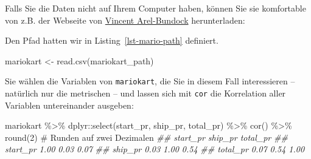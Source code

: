 \documentclass[
  a4paper,
]{scrbook}
\newenvironment{Shaded}{\begin{snugshade}}{\end{snugshade}}
\newcommand{\CommentTok}[1]{\textcolor[rgb]{0.37,0.37,0.37}{#1}}
\newcommand{\DecValTok}[1]{\textcolor[rgb]{0.68,0.00,0.00}{#1}}
\newcommand{\DocumentationTok}[1]{\textcolor[rgb]{0.37,0.37,0.37}{\textit{#1}}}
\newcommand{\FunctionTok}[1]{\textcolor[rgb]{0.28,0.35,0.67}{#1}}
\newcommand{\NormalTok}[1]{\textcolor[rgb]{0.00,0.23,0.31}{#1}}
\newcommand{\OtherTok}[1]{\textcolor[rgb]{0.00,0.23,0.31}{#1}}
\newcommand{\SpecialCharTok}[1]{\textcolor[rgb]{0.37,0.37,0.37}{#1}}
\theoremstyle{definition}
\theoremstyle{definition}
\theoremstyle{definition}
\theoremstyle{remark}
\begin{document}
Falls Sie die Daten nicht auf Ihrem Computer haben, können Sie sie
komfortable von z.B. der Webseite von
\href{https://vincentarelbundock.github.io/Rdatasets}{Vincent
Arel-Bundock} herunterladen:

Den Pfad hatten wir in Listing~\ref{lst-mario-path} definiert.

\begin{Shaded}
\begin{Highlighting}[]
\NormalTok{mariokart }\OtherTok{\textless{}{-}} \FunctionTok{read.csv}\NormalTok{(mariokart\_path)}
\end{Highlighting}
\end{Shaded}

Sie wählen die Variablen von \texttt{mariokart}, die Sie in diesem Fall
interessieren -- natürlich nur die metrischen -- und lassen sich mit
\texttt{cor} die Korrelation aller Variablen untereinander ausgeben:

\begin{Shaded}
\begin{Highlighting}[]
\NormalTok{mariokart }\SpecialCharTok{\%\textgreater{}\%}  
\NormalTok{  dplyr}\SpecialCharTok{::}\FunctionTok{select}\NormalTok{(start\_pr, ship\_pr, total\_pr) }\SpecialCharTok{\%\textgreater{}\%} 
  \FunctionTok{cor}\NormalTok{() }\SpecialCharTok{\%\textgreater{}\%} 
  \FunctionTok{round}\NormalTok{(}\DecValTok{2}\NormalTok{) }\CommentTok{\# Runden auf zwei Dezimalen}
\DocumentationTok{\#\#          start\_pr ship\_pr total\_pr}
\DocumentationTok{\#\# start\_pr     1.00    0.03     0.07}
\DocumentationTok{\#\# ship\_pr      0.03    1.00     0.54}
\DocumentationTok{\#\# total\_pr     0.07    0.54     1.00}
\end{Highlighting}
\end{Shaded}
\end{document}
